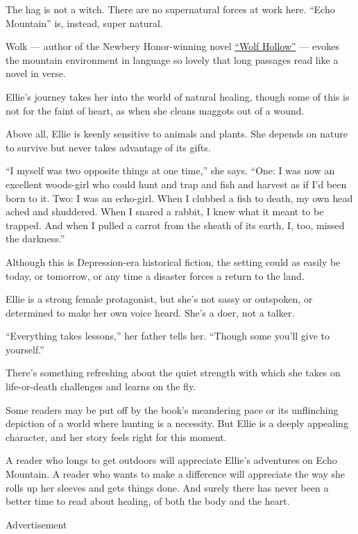The hag is not a witch. There are no supernatural forces at work here.
``Echo Mountain'' is, instead, super natural.

Wolk --- author of the Newbery Honor-winning novel
\href{https://www.nytimes3xbfgragh.onion/2016/05/08/books/review/wolf-hollow-by-lauren-wolk.html}{``Wolf
Hollow''} --- evokes the mountain environment in language so lovely that
long passages read like a novel in verse.

Ellie's journey takes her into the world of natural healing, though some
of this is not for the faint of heart, as when she cleans maggots out of
a wound.

Above all, Ellie is keenly sensitive to animals and plants. She depends
on nature to survive but never takes advantage of its gifts.

``I myself was two opposite things at one time,'' she says. ``One: I was
now an excellent woods-girl who could hunt and trap and fish and harvest
as if I'd been born to it. Two: I was an echo-girl. When I clubbed a
fish to death, my own head ached and shuddered. When I snared a rabbit,
I knew what it meant to be trapped. And when I pulled a carrot from the
sheath of its earth, I, too, missed the darkness.''

Although this is Depression-era historical fiction, the setting could as
easily be today, or tomorrow, or any time a disaster forces a return to
the land.

Ellie is a strong female protagonist, but she's not sassy or outspoken,
or determined to make her own voice heard. She's a doer, not a talker.

``Everything takes lessons,'' her father tells her. ``Though some you'll
give to yourself.''

There's something refreshing about the quiet strength with which she
takes on life-or-death challenges and learns on the fly.

Some readers may be put off by the book's meandering pace or its
unflinching depiction of a world where hunting is a necessity. But Ellie
is a deeply appealing character, and her story feels right for this
moment.

A reader who longs to get outdoors will appreciate Ellie's adventures on
Echo Mountain. A reader who wants to make a difference will appreciate
the way she rolls up her sleeves and gets things done. And surely there
has never been a better time to read about healing, of both the body and
the heart.

Advertisement

